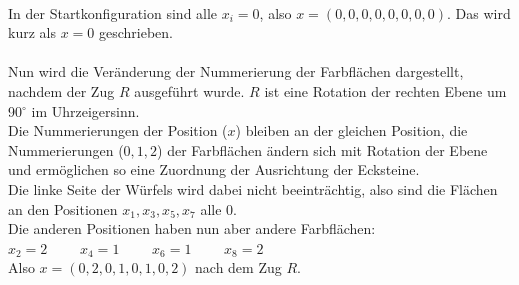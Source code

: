 \documentclass[12pt,a4paper, usenames, dvipsnames]{article}
\begin{document}
\ \\
In der Startkonfiguration sind alle $x_i = 0$, also $x=(0, 0, 0, 0, 0, 0, 0, 0)$. Das wird kurz als $x=0$ geschrieben.\\
\ \\
Nun wird die Veränderung der Nummerierung der Farbflächen dargestellt, nachdem der Zug $R$ ausgeführt wurde. $R$ ist eine Rotation der rechten Ebene um 90$^\circ$ im Uhrzeigersinn. \\
Die Nummerierungen der Position ($x$) bleiben an der gleichen Position, die Nummerierungen ($0, 1, 2$) der Farbflächen ändern sich mit Rotation der Ebene und ermöglichen so eine Zuordnung der Ausrichtung der Ecksteine. \\
Die linke Seite der Würfels wird dabei nicht beeinträchtig, also sind die Flächen an den Positionen $x_1, x_3, x_5, x_7$ alle 0. \\
Die anderen Positionen haben nun aber andere Farbflächen: \\
$x_2 = 2$ \ \ \ \ $x_4 = 1$ \ \ \ \ $x_6 = 1$ \ \ \ \ $x_8 = 2$  \\
Also $x = (0, 2, 0, 1, 0, 1, 0, 2)$ nach dem Zug $R$. \\
\end{document}
